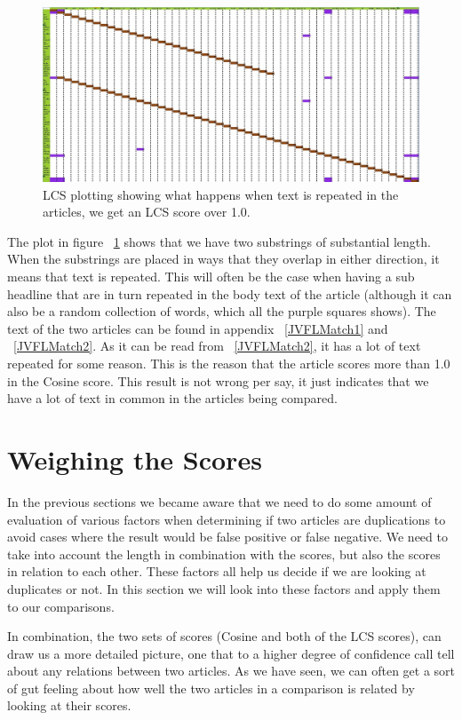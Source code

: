 \begin{figure}
	\centering
	\includegraphics[scale=0.35]{figures/Over}
	\caption{LCS plotting showing what happens when text is repeated in the articles, we get an LCS score over 1.0.}
	\label{Over100}
\end{figure}

The plot in figure ~\ref{Over100} shows that we have two substrings of substantial length. When the substrings are placed in ways that they overlap in either direction, it means that text is repeated. This will often be the case when having a sub headline that are in turn repeated in the body text of the article (although it can also be a random collection of words, which all the purple squares shows). The text of the two articles can be found in appendix ~\ref{JVFLMatch1} and ~\ref{JVFLMatch2}. As it can be read from ~\ref{JVFLMatch2}, it has a lot of text repeated for some reason. This is the reason that the article scores more than 1.0 in the Cosine score. This result is not wrong per say, it just indicates that we have a lot of text in common in the articles being compared.

\section{Weighing the Scores}
In the previous sections we became aware that we need to do some amount of evaluation of various factors when determining if two articles are duplications to avoid cases where the result would be false positive or false negative. We need to take into account the length in combination with the scores, but also the scores in relation to each other. These factors all help us decide if we are looking at duplicates or not. In this section we will look into these factors and apply them to our comparisons.

In combination, the two sets of scores (Cosine and both of the LCS scores), can draw us a more detailed picture, one that to a higher degree of confidence call tell about any relations between two articles. As we have seen, we can often get a sort of gut feeling about how well the two articles in a comparison is related by looking at their scores.

